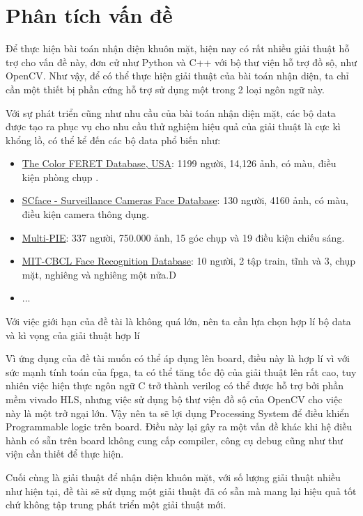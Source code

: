 \documentclass[a4paper]{report}
\begin{document}
\section{Phân tích vấn đề}
Để thực hiện bài toán nhận diện khuôn mặt, hiện nay có rất nhiều giải thuật hỗ trợ cho vấn đề này, đơn cử như Python và C++ với bộ thư viện hỗ trợ đồ sộ, như OpenCV. Như vậy, để có thể thực hiện giải thuật của bài toán nhận diện, ta chỉ cần một thiết bị phần cứng hỗ trợ sử dụng một trong 2 loại ngôn ngữ này. 
\par\noindent 
Với sự phát triển cũng như nhu cầu của bài toán nhận diện mặt, các bộ data được tạo ra phục vụ cho nhu cầu thử nghiệm hiệu quả của giải thuật là cực kì khổng lồ, có thể kể đến các bộ data phổ biến \cite{dataset} như:
\begin{itemize}
\item \href{http://www.nist.gov/itl/iad/ig/colorferet.cfm}{The Color FERET Database, USA}: 1199 người, 14,126 ảnh, có màu, điều kiện phòng chụp .
\item \href{http://www.scface.org/}{SCface - Surveillance Cameras Face Database}: 130 người, 4160 ảnh, có màu, điều kiện camera thông dụng.
\item \href{http://www.multipie.org/}{Multi-PIE}: 337 người, 750.000 ảnh, 15 góc chụp và 19 điều kiện chiếu sáng.
\item \href{http://cbcl.mit.edu/software-datasets/heisele/facerecognition-database.html}{MIT-CBCL Face Recognition Database}: 10 người, 2 tập train, tĩnh và 3, chụp mặt, nghiêng và nghiêng một nửa.D
\item ...
\end{itemize}
Với việc giới hạn của đề tài là không quá lớn, nên ta cần lựa chọn hợp lí bộ data và kì vọng của giải thuật hợp lí
\par\noindent
Vì ứng dụng của đề tài muốn có thể áp dụng lên board, điều này là hợp lí vì với sức mạnh tính toán của fpga, ta có thể tăng tốc độ của giải thuật lên rất cao, tuy nhiên việc hiện thực ngôn ngữ C trở thành verilog có thể được hỗ trợ bởi phần mềm vivado HLS, nhưng việc sử dụng bộ thư viện đồ sộ của OpenCV cho việc này là một trở ngại lớn. Vậy nên ta sẽ lợi dụng Processing System để điều khiển Programmable logic trên board. Điều này lại gây ra một vấn đề khác khi hệ điều hành có sẵn trên board không cung cấp compiler, công cụ debug cũng như thư viện cần thiết để thực hiện.
\par\noindent
Cuối cùng là giải thuật để nhận diện khuôn mặt, với số lượng giải thuật nhiều như hiện tại, đề tài sẽ sử dụng một giải thuật đã có sẵn mà mang lại hiệu quả tốt chứ không tập trung phát triển một giải thuật mới.
\end{document}
